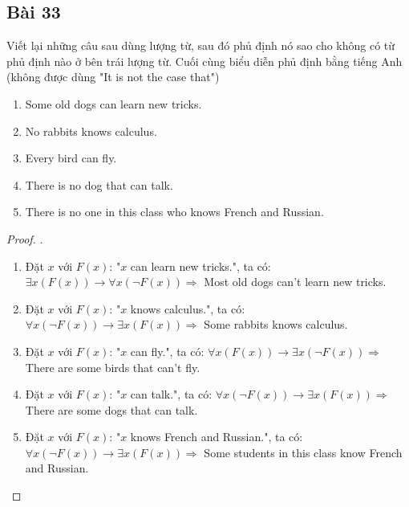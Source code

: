 \subsection*{Bài 33}
Viết lại những câu sau dùng lượng từ, sau đó phủ định nó sao cho không có từ phủ định nào ở bên trái lượng từ. Cuối cùng biểu diễn phủ định bằng tiếng Anh (không được dùng "It is not the case that")
\begin{enumerate}[label=\alph*)]
    \item Some old dogs can learn new tricks.
    \item No rabbits knows calculus.
    \item Every bird can fly.
    \item There is no dog that can talk.
    \item There is no one in this class who knows French and
    Russian.
\end{enumerate}
\begin{proof}.
    \begin{enumerate}[label=\alph*)]
        \item Đặt $x$ với $F(x)$: "$x$ can learn new tricks.", ta có: $\exists x(F(x))\rightarrow \forall x(\neg F(x))\Rightarrow$ Most old dogs can't learn new tricks.
        \item Đặt $x$ với $F(x)$: "$x$ knows calculus.", ta có: $\forall x(\neg F(x))\rightarrow \exists x(F(x))\Rightarrow$ Some rabbits knows calculus.
        \item Đặt $x$ với $F(x)$: "$x$ can fly.", ta có: $\forall x(F(x))\rightarrow \exists x(\neg F(x))\Rightarrow$ There are some birds that can't fly.
        \item Đặt $x$ với $F(x)$: "$x$ can talk.", ta có: $\forall x(\neg F(x))\rightarrow \exists x(F(x))\Rightarrow$ There are some dogs that can talk.
        \item Đặt $x$ với $F(x)$: "$x$ knows French and Russian.", ta có: $\forall x(\neg F(x))\rightarrow \exists x(F(x))\Rightarrow$ Some students in this class know French and Russian.
    \end{enumerate}
\end{proof}
